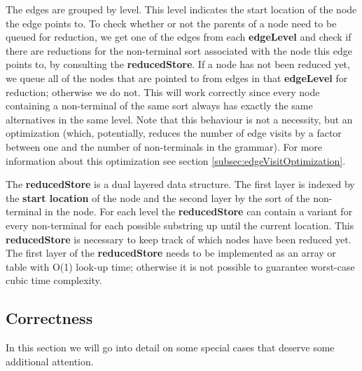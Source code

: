 \documentclass[a4paper,10pt]{article}
\begin{document}
The edges are grouped by level. This level indicates the start location of the node the edge points to. To check whether or not the parents of a node need to be queued for reduction, we get one of the edges from each {\bf edgeLevel} and check if there are reductions for the non-terminal sort associated with the node this edge points to, by consulting the {\bf reducedStore}. If a node has not been reduced yet, we queue all of the nodes that are pointed to from edges in that {\bf edgeLevel} for reduction; otherwise we do not. This will work correctly since every node containing a non-terminal of the same sort always has exactly the same alternatives in the same level. Note that this behaviour is not a necessity, but an optimization (which, potentially, reduces the number of edge visits by a factor between one and the number of non-terminals in the grammar). For more information about this optimization see section \ref{subsec:edgeVisitOptimization}.

The {\bf reducedStore} is a dual layered data structure. The first layer is indexed by the {\bf start location} of the node and the second layer by the sort of the non-terminal in the node. For each level the {\bf reducedStore} can contain a variant for every non-terminal for each possible substring up until the current location. This {\bf reducedStore} is necessary to keep track of which nodes have been reduced yet. The first layer of the {\bf reducedStore} needs to be implemented as an array or table with O(1) look-up time; otherwise it is not possible to guarantee worst-case cubic time complexity.

\subsection{Correctness}

In this section we will go into detail on some special cases that deserve some additional attention.
\end{document}
